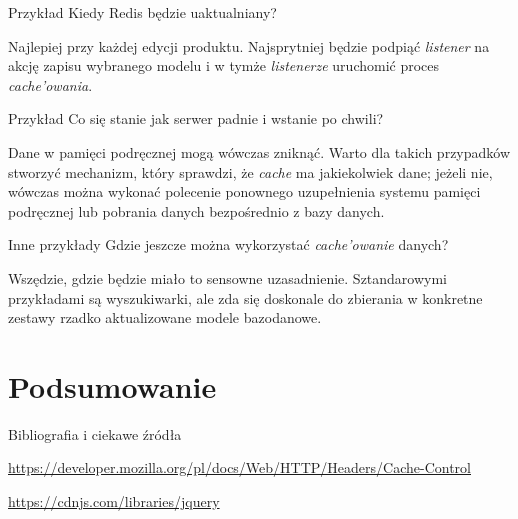 \begin{frame}{Przykład}	
	Kiedy Redis będzie uaktualniany?
	
	Najlepiej przy każdej edycji produktu. Najsprytniej będzie podpiąć \emph{listener} na akcję zapisu wybranego modelu i w tymże \emph{listenerze} uruchomić proces \emph{cache'owania}.
\end{frame}

\begin{frame}{Przykład}	
	Co się stanie jak serwer padnie i wstanie po chwili?
	
	Dane w pamięci podręcznej mogą wówczas zniknąć. Warto dla takich przypadków stworzyć mechanizm, który sprawdzi, że \emph{cache} ma jakiekolwiek dane; jeżeli nie, wówczas można wykonać polecenie ponownego uzupełnienia systemu pamięci podręcznej lub pobrania danych bezpośrednio z bazy danych.
\end{frame}

\begin{frame}{Inne przykłady}	
	Gdzie jeszcze można wykorzystać \emph{cache'owanie} danych?
	
	Wszędzie, gdzie będzie miało to sensowne uzasadnienie. Sztandarowymi przykładami są wyszukiwarki, ale zda się doskonale do zbierania w konkretne zestawy rzadko aktualizowane modele bazodanowe.
\end{frame}

\section{Podsumowanie}

\begin{frame}{Bibliografia i ciekawe źródła}
  
	\begin{thebibliography}{9}
		
		\url{https://developer.mozilla.org/pl/docs/Web/HTTP/Headers/Cache-Control}
		
		\url{https://cdnjs.com/libraries/jquery}
		
	\end{thebibliography}

\end{frame}

